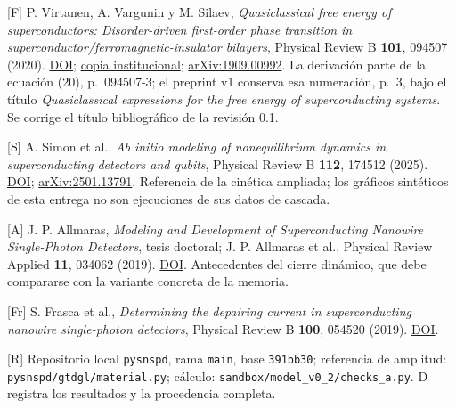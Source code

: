 \documentclass[
  spanish,
  10pt,
  a4paper,
]{article}
\newcounter{none} %
\begin{document}
{[}F{]} P. Virtanen, A. Vargunin y M. Silaev, \emph{Quasiclassical free
energy of superconductors: Disorder-driven first-order phase transition
in superconductor/ferromagnetic-insulator bilayers}, Physical Review B
\textbf{101}, 094507 (2020).
\href{https://doi.org/10.1103/PhysRevB.101.094507}{DOI};
\href{https://jyx.jyu.fi/bitstreams/f577693c-c6d1-4923-866c-353ec3ac8dd5/download}{copia
institucional};
\href{https://arxiv.org/pdf/1909.00992}{arXiv:1909.00992}. La derivación
parte de la ecuación (20), p.~094507-3; el preprint v1 conserva esa
numeración, p.~3, bajo el título \emph{Quasiclassical expressions for
the free energy of superconducting systems}. Se corrige el título
bibliográfico de la revisión 0.1.

{[}S{]} A. Simon et al., \emph{Ab initio modeling of nonequilibrium
dynamics in superconducting detectors and qubits}, Physical Review B
\textbf{112}, 174512 (2025).
\href{https://doi.org/10.1103/3m2k-mzr6}{DOI};
\href{https://arxiv.org/abs/2501.13791}{arXiv:2501.13791}. Referencia de
la cinética ampliada; los gráficos sintéticos de esta entrega no son
ejecuciones de sus datos de cascada.

{[}A{]} J. P. Allmaras, \emph{Modeling and Development of
Superconducting Nanowire Single-Photon Detectors}, tesis doctoral; J. P.
Allmaras et al., Physical Review Applied \textbf{11}, 034062 (2019).
\href{https://doi.org/10.1103/PhysRevApplied.11.034062}{DOI}.
Antecedentes del cierre dinámico, que debe compararse con la variante
concreta de la memoria.

{[}Fr{]} S. Frasca et al., \emph{Determining the depairing current in
superconducting nanowire single-photon detectors}, Physical Review B
\textbf{100}, 054520 (2019).
\href{https://doi.org/10.1103/PhysRevB.100.054520}{DOI}.

{[}R{]} Repositorio local \nolinkurl{pysnspd}, rama \nolinkurl{main}, base
\nolinkurl{391bb30}; referencia de amplitud:
\nolinkurl{pysnspd/gtdgl/material.py}; cálculo:
\nolinkurl{sandbox/model_v0_2/checks_a.py}. D registra los resultados y
la procedencia completa.
\end{document}
